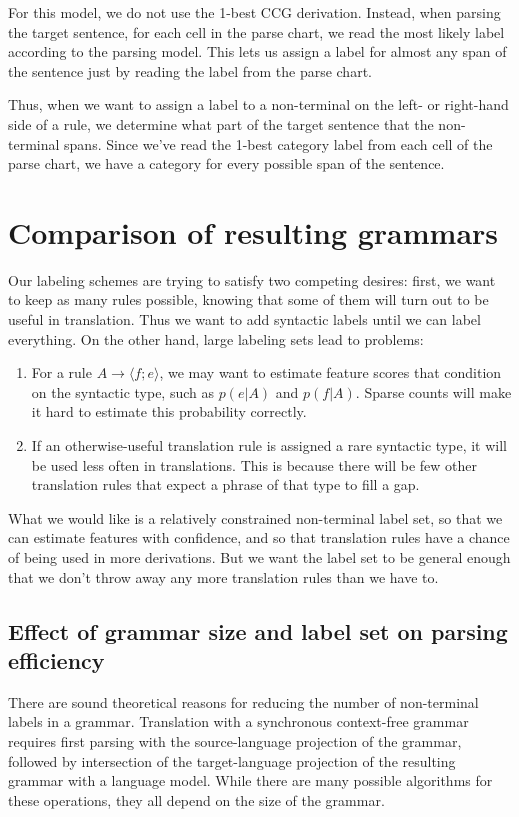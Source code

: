 \documentclass{article}
\begin{document}
For this model, we do not use the 1-best CCG derivation. Instead, when parsing the target sentence, for each cell in the parse chart, we read the most likely label according to the parsing model. This lets us assign a label for almost any span of the sentence just by reading the label from the parse chart.

Thus, when we want to assign a label to a non-terminal on the left- or right-hand side of a rule, we determine what part of the target sentence that the non-terminal spans. Since we've read the 1-best category label from each cell of the parse chart, we have a category for every possible span of the sentence.

\section{Comparison of resulting grammars}
\label{sec:comparison}

Our labeling schemes are trying to satisfy two competing desires: first, we want to keep as many rules possible, knowing that some of them will turn out to be useful in translation. Thus we want to add syntactic labels until we can label everything. On the other hand, large labeling sets lead to problems:
\begin{enumerate}
\item For a rule $A \to \langle f ; e \rangle$, we may want to estimate feature scores that condition on the syntactic type, such as $p(e|A)$ and $p(f|A)$. Sparse counts will make it hard to estimate this probability correctly.
\item If an otherwise-useful translation rule is assigned a rare syntactic type, it will be used less often in translations. This is because there will be few other translation rules that expect a phrase of that type to fill a gap.
\end{enumerate}
What we would like is a relatively constrained non-terminal label set, so that we can estimate features with confidence, and so that translation rules have a chance of being used in more derivations. But we want the label set to be general enough that we don't throw away any more translation rules than we have to.


\subsection{Effect of grammar size and label set on parsing efficiency}

There are sound theoretical reasons for reducing the number of non-terminal labels in a grammar. Translation with a synchronous context-free grammar requires first parsing with the source-language projection of the grammar, followed by intersection of the target-language projection of the resulting grammar with a language model. While there are many possible algorithms for these operations, they all depend on the size of the grammar.
\end{document}

